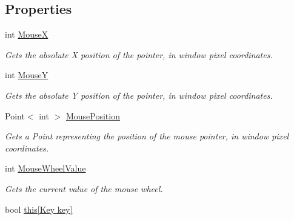 \subsection*{Properties}
\begin{DoxyCompactItemize}
\item 
int \hyperlink{interface_tri_devs_1_1_tri_engine2_d_1_1_input_1_1_i_input_manager_a545e03fc7c5084bcf00f018145625c19}{Mouse\-X}
\begin{DoxyCompactList}\small\item\em Gets the absolute X position of the pointer, in window pixel coordinates. \end{DoxyCompactList}\item 
int \hyperlink{interface_tri_devs_1_1_tri_engine2_d_1_1_input_1_1_i_input_manager_a143f5147279fe1807635d1e8b9b4e7c7}{Mouse\-Y}
\begin{DoxyCompactList}\small\item\em Gets the absolute Y position of the pointer, in window pixel coordinates. \end{DoxyCompactList}\item 
Point$<$ int $>$ \hyperlink{interface_tri_devs_1_1_tri_engine2_d_1_1_input_1_1_i_input_manager_a1c7099f4027c14a36873ca2809ecdb62}{Mouse\-Position}
\begin{DoxyCompactList}\small\item\em Gets a Point representing the position of the mouse pointer, in window pixel coordinates. \end{DoxyCompactList}\item 
int \hyperlink{interface_tri_devs_1_1_tri_engine2_d_1_1_input_1_1_i_input_manager_a7d42befc637abbaf51f46ba93d12aff8}{Mouse\-Wheel\-Value}
\begin{DoxyCompactList}\small\item\em Gets the current value of the mouse wheel. \end{DoxyCompactList}\item 
bool \hyperlink{interface_tri_devs_1_1_tri_engine2_d_1_1_input_1_1_i_input_manager_a4864942443d3939d630504c7da9fbfd6}{this\mbox{[}\-Key key\mbox{]}}

\end{DoxyCompactItemize}
